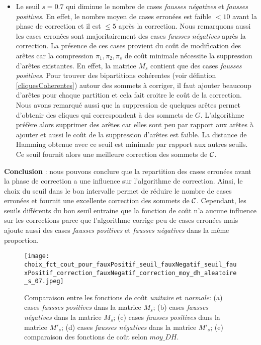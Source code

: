 \begin{itemize}
	\item Le seuil $s=0.7$ qui diminue le nombre de cases {\em fausses n\'egatives} et {\em fausses positives}. En effet, le nombre moyen de cases erron\'ees est faible $< 10$ avant la phase de correction et il est $ \le 5$ apr\`es la correction. 
	Nous remarquons aussi les cases erron\'ees sont majoritairement des cases {\em fausses n\'egatives} apr\`es la correction.
	La pr\'esence de ces cases provient du co\^ut de modification des ar\^etes car la compression $\pi_1,\pi_2, \pi_s$ de co\^ut minimale n\'ecessite la suppression d'ar\^etes existantes.
	En effet, la matrice $M_s$ contient que des cases {\em fausses positives}. Pour trouver des bipartitions coh\'erentes (voir d\'efintion \ref{cliquesCoherentes}) autour des sommets \`a corriger, il faut ajouter beaucoup d'ar\^etes pour chaque partition et cela fait croitre le co\^ut de la correction. 
	Nous avons remarqu\'e aussi que la suppression de quelques ar\^etes permet d'obtenir des cliques qui correspondent \`a des sommets de $G$. L'algorithme pr\'ef\`ere alors supprimer des ar\^etes car elles sont peu par rapport aux ar\^etes \`a ajouter et aussi le co\^ut de la suppression d'ar\^etes est faible.
	 La distance de Hamming obtenue avec ce seuil est minimale par rapport aux autres seuils. Ce seuil fournit alors une meilleure correction des sommets de ${\cal C}$. 
	
\end{itemize}

{\bf Conclusion} : 
nous pouvons conclure que la repartition des cases erron\'ees avant la phase de correction a une influence sur l'algorithme de correction. 
Ainsi, le choix du seuil dans le bon intervalle permet de r\'eduire le nombre de cases erron\'ees et fournit une excellente correction des sommets de ${\cal C}$. 
Cependant,  les seuils diff\'erents du bon seuil  entraine que la fonction de co\^ut n'a aucune influence sur les corrections parce que l'algorithme corrige peu de cases erron\'ees mais ajoute aussi des cases {\em fausses positives} et {\em fausses n\'egatives} dans la m\^eme proportion. 

\begin{figure}[htb!] 
\centering
\texttt{[image: choix\_fct\_cout\_pour\_fauxPositif\_seuil\_fauxNegatif\_seuil\_fauxPositif\_correction\_fauxNegatif\_correction\_moy\_dh\_aleatoire\_s\_07.jpeg]}
\caption{ Comparaison entre les fonctions de co\^ut {\em unitaire} et {\em normale}: (a) cases {\em fausses positives} dans la matrice $M_s$; (b) cases {\em fausses n\'egatives} dans la matrice $M_s$; (c) cases {\em fausses positives} dans la matrice $M'_s$; (d) cases {\em fausses n\'egatives} dans la matrice $M'_s$; (e) comparaison des fonctions de co\^ut selon $moy\_DH$.}
\label{comparaisonFctCoutUnitaireNormale} 
\end{figure}
 \FloatBarrier

